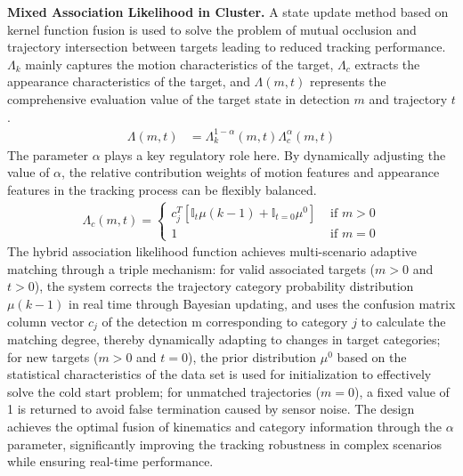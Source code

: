 \documentclass[journal,twoside,web]{ieeecolor}
\begin{document}
\textbf{Mixed Association Likelihood in Cluster.}
A state update method based on kernel function fusion is used to solve the problem of mutual occlusion and trajectory intersection between targets leading to reduced tracking performance.
\(\Lambda_{k}\) mainly captures the motion characteristics of the target, \(\Lambda_{c}\) extracts the appearance characteristics of the target, and \(\Lambda(m, t)\) represents the comprehensive evaluation value of the target state in detection \(m\) and trajectory \(t\).
\begin{align}
	\Lambda(m, t) & = \Lambda_{k}^{1-\alpha}(m, t) \Lambda_{c}^{\alpha}(m, t)
\end{align}
The parameter \(\alpha\) plays a key regulatory role here. By dynamically adjusting the value of \(\alpha\), the relative contribution weights of motion features and appearance features in the tracking process can be flexibly balanced.
\begin{align}
	\Lambda_{c}(m, t) = \left\{\begin{array}{ll}
		c_{j}^{T}\left[\mathbb{I}_t \mu(k-1)+\mathbb{I}_{t = 0} \mu^{0}\right] & \text { if } m>0 \\
		1 & \text { if } m = 0
	\end{array}\right.
\end{align}
The hybrid association likelihood function achieves multi-scenario adaptive matching through a triple mechanism: for valid associated targets (\(m>0\) and \(t>0\)), the system corrects the trajectory category probability distribution \(\mu(k-1)\) in real time through Bayesian updating, and uses the confusion matrix column vector \(c_j\) of the detection m corresponding to category \(j\) to calculate the matching degree, thereby dynamically adapting to changes in target categories; for new targets (\(m>0\) and \(t=0\)), the prior distribution \(\mu^{0}\) based on the statistical characteristics of the data set is used for initialization to effectively solve the cold start problem; for unmatched trajectories (\(m=0\)), a fixed value of 1 is returned to avoid false termination caused by sensor noise. The design achieves the optimal fusion of kinematics and category information through the \(\alpha\) parameter, significantly improving the tracking robustness in complex scenarios while ensuring real-time performance.
\end{document}
